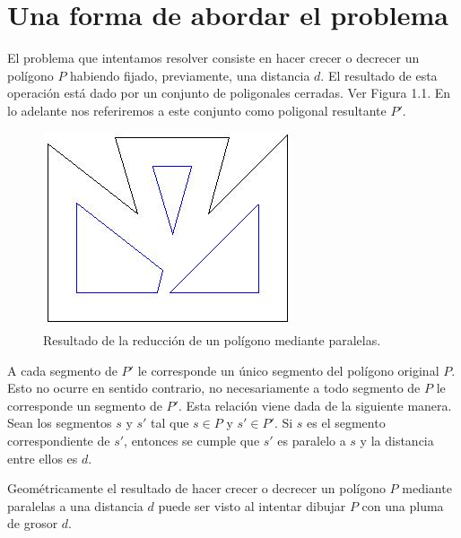 \documentclass[12pt,english]{report}
\begin{document}
\setcounter{secnumdepth}{2}
\chapter{Una forma de abordar el problema}

El problema que intentamos resolver consiste en hacer crecer o decrecer un pol\'igono $P$ habiendo fijado, previamente, una distancia $d$. El resultado de esta operaci\'on est\'a dado por un conjunto de poligonales cerradas. Ver Figura 1.1. En lo adelante nos referiremos a este conjunto como poligonal resultante $P'$.   

\begin{figure}[htbp]
\begin{center}
\includegraphics{conjuntop.jpg}%
\end{center}
\caption{Resultado de la reducci\'on de un pol\'igono mediante paralelas.}
\end{figure}

A cada segmento de $P'$ le corresponde un \'unico segmento del pol\'igono original $P$. Esto no ocurre en sentido contrario, no necesariamente a todo segmento de $P$ le corresponde un segmento de $P'$. Esta relaci\'on viene dada de la siguiente manera. Sean los segmentos $s$ y $s'$ tal que $s \in P$ y $s' \in P'$. Si $s$ es el segmento correspondiente de $s'$, entonces se cumple que $s'$ es paralelo a $s$ y la distancia entre ellos es $d$.

Geom\'etricamente el resultado de hacer crecer o decrecer un pol\'igono $P$ mediante paralelas a una distancia $d$ puede ser visto al intentar dibujar $P$ con una pluma de grosor $d$. %
\end{document}
